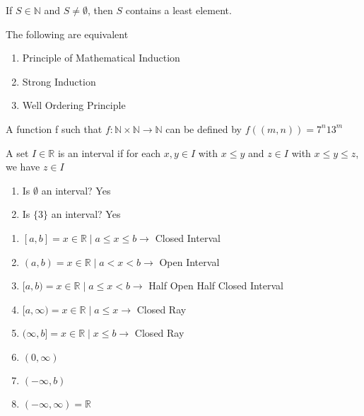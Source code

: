 


\begin{thm}

If $S\in \mathbb{N}$ and $S\neq \emptyset$, then $S$ contains a least element.

\end{thm}

The following are equivalent
\begin{enumerate}
\item Principle of Mathematical Induction
\item Strong Induction
\item Well Ordering Principle 
\end{enumerate}

\begin{note}

A function f such that $f\colon \mathbb{N}\times \mathbb{N} \to \mathbb{N}$ can be defined by $f((m,n))=7^n13^m$

\end{note}



\begin{thm}
A set $I\in \mathbb{R}$ is an interval if for each $x,y\in I$ with $x\leq y$ and $z\in I$ with $x\leq y\leq z$, we have $z\in I$
\end{thm}

\begin{ques}
\begin{enumerate}
\item Is $\emptyset$ an interval? Yes
\item Is $\{3\}$ an interval? Yes
\end{enumerate}
\end{ques}

\begin{enumerate}
\item $[a,b] = {x\in \mathbb{R} \mid a\leq x\leq b} \to$ Closed Interval 
\item $(a,b) = {x\in \mathbb{R} \mid a< x<  b} \to$ Open Interval 
\item $[a,b) = {x\in \mathbb{R} \mid a\leq x< b} \to$ Half Open Half Closed Interval 
\item $[a,\infty) = {x\in \mathbb{R} \mid a\leq x} \to$ Closed Ray 
\item $(\infty,b] = {x\in \mathbb{R} \mid x\leq b} \to$ Closed Ray
\item $(0,\infty)$
\item $(-\infty ,b)$
\item $(-\infty ,\infty) = \mathbb{R}$
\end{enumerate}

